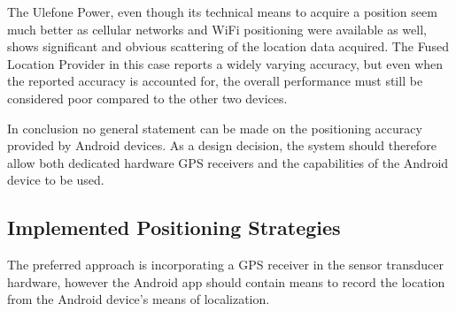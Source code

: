 The Ulefone Power, even though its technical means to acquire a position seem much better as cellular networks and WiFi positioning were available as well, shows significant and obvious scattering of the location data acquired. The Fused Location Provider in this case reports a widely varying accuracy, but even when the reported accuracy is accounted for, the overall performance must still be considered poor compared to the other two devices.

In conclusion no general statement can be made on the positioning accuracy provided by Android devices. As a design decision, the system should therefore allow both dedicated hardware GPS receivers and the capabilities of the Android device to be used.

\subsection{Implemented Positioning Strategies}
The preferred approach is incorporating a GPS receiver in the sensor transducer hardware, however the Android app should contain means to record the location from the Android device's means of localization. 